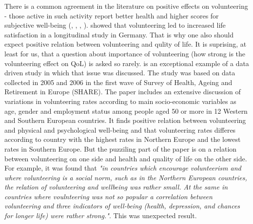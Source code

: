 \documentclass[10pt, letterpaper]{article}
\begin{document}
\begin{spacing}{1.4}
There is a common agreement in the literature on positive effects on volunteering - those active in such activity report better health and higher scores for subjective well-being (\citet{haski09}, \citet{morrow2003}, \citep{thoits03}, \citep{whillans2016}). \citep{meier08} showed that volunteering led to increased life satisfaction in a longitudinal study in Germany. That is why one also should expect positive relation between volunteering and qulity of life. It is suprising, at least for us, that a question about importance of volunteering (how strong is the volunteering effect on QoL) is asked so rarely. \citet{haski09} is an exceptional example of a data driven study in which that issue was discussed. The study was based on data collected in 2005 and 2006 in the first wave of Survey of Health, Ageing and Retirement in Europe (SHARE). The paper includes an extensive discussion of variations in volunteering rates according to main socio-economic variables as age, gender and employment status among people aged 50 or more in 12 Western and Southern European countries. It finds positive relation between volunteering and physical and psychological well-being and that volunteering rates differes according to country  with the highest rates in Northern Europe and the lowest rates in Southern Europe.  But the puzziling part of the paper is on a relation between volunteering on one side and health and quality of life on the other side. For example, it was found that \textit{"in countries which encourage volunteerism and where volunteering is a social norm, such as in the Northern European countries, the relation of volunteering and wellbeing was rather small. At the same in countries where voulnteering was not so popular  a correlation between volunteering and three indicators of well-being (health, depression, and chances for longer life) were rather strong."}. This was unexpected result. \\


\end{spacing}
\end{document}
